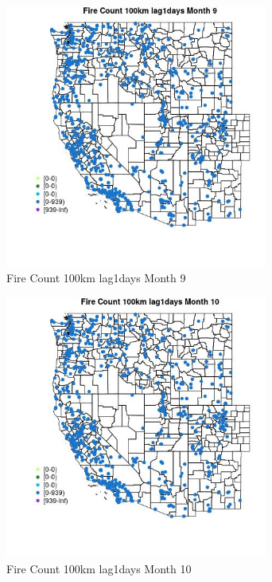 \begin{figure} 
\centering  
\includegraphics[width=0.77\textwidth]{Code_Outputs/Report_ML_input_PM25_Step4_part_e_de_duplicated_aves_compiled_2019-05-21wNAs_MapObsMo9Fire_Count_100km_lag1days.jpg} 
\caption{\label{fig:Report_ML_input_PM25_Step4_part_e_de_duplicated_aves_compiled_2019-05-21wNAsMapObsMo9Fire_Count_100km_lag1days}Fire Count 100km lag1days Month 9} 
\end{figure} 
 

\begin{figure} 
\centering  
\includegraphics[width=0.77\textwidth]{Code_Outputs/Report_ML_input_PM25_Step4_part_e_de_duplicated_aves_compiled_2019-05-21wNAs_MapObsMo10Fire_Count_100km_lag1days.jpg} 
\caption{\label{fig:Report_ML_input_PM25_Step4_part_e_de_duplicated_aves_compiled_2019-05-21wNAsMapObsMo10Fire_Count_100km_lag1days}Fire Count 100km lag1days Month 10} 
\end{figure} 
 

